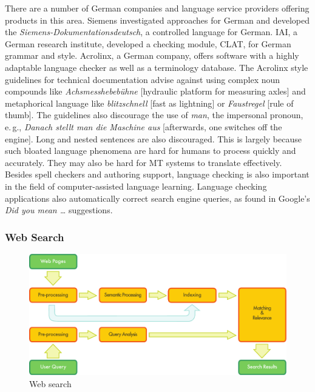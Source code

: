 \documentclass[]{../../metanetpaper}
\begin{document}
\begin{multicols}{2}

There are a number of German companies and language service providers offering products in this area. Siemens investigated approaches for German and developed the \textit{Siemens-Dokumentationsdeutsch}, a controlled language for German. IAI, a German research institute, developed a checking module, CLAT, for German grammar and style. Acrolinx, a German company, offers software with a highly adaptable language checker as well as a terminology database. The Acrolinx style guidelines for technical documentation advise against using complex noun compounds like \textit{Achsmesshebebühne} {[}hydraulic platform for measuring axles{]} and metaphorical language like \textit{blitzschnell} {[}fast as lightning{]} or \textit{Faustregel} {[}rule of thumb{]}. The guidelines also discourage the use of \textit{man}, the impersonal pronoun, e.\,g., \textit{Danach stellt man die Maschine aus} {[}afterwards, one switches off the engine{]}. Long and nested sentences are also discouraged. This is largely because such bloated language phenomena are hard for humans to process quickly and accurately. They may also be hard for MT systems to translate effectively. Besides spell checkers and authoring support, language checking is also important in the field of computer-assisted language learning. Language checking applications also automatically correct search engine queries, as found in Google's \textit{Did you mean \dots} suggestions.

\subsubsection{Web Search}

\begin{figure}[htb]
  \center
  \includegraphics[width=\textwidth]{../_media/english/web_search_architecture}
  \caption{Web search}
  \label{fig:websearcharch_en}
 \end{figure}


\end{multicols}
\end{document}
